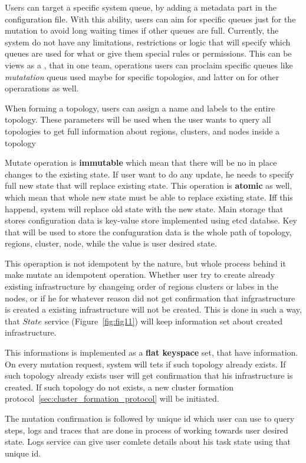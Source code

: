 Users can target a specific system queue, by adding a metadata part in the configuration file. With this ability, users can aim for specific queues just for the mutation to avoid long waiting times if other queues are full. Currently, the system do not have any limitations, restrictions or logic that will specify which queues are used for what or give them special rules or permissions. This can be views as a , that in one team, operations users can proclaim specific queues like \textit{mutatation} queus used maybe for specific topologies, and latter on for other operarations as well.

When forming a topology, users can assign a name and labels to the entire topology. These parameters will be used when the user wants to query all topologies to get full information about regions, clusters, and nodes inside a topology

Mutate operation is \textbf{immutable} which mean that there will be no in place changes to the existing state. If user want to do any update, he needs to specify full new state that will replace existing state. This operation is \textbf{atomic} as well, which mean that whole new state must be able to replace existing state. Iff this happend, system will replace old state with the new state. Main storage that stores configuration data is key-value store implemented using etcd databse. Key that will be used to store the confuguration data is the whole path of topology, regions, cluster, node, while the value is user desired state.

This operaption is not idempotent by the nature, but whole process behind it make mutate an idempotent operation. Whether user try to create already existing infrastructure by changeing order of regions clusters or labes in the nodes, or if he for whatever reason did not get confirmation that infgrastructure is created a existing infrastructure will not be created. This is done in such a way, that $State$ service (Figure~\ref{fig:fig11}) will keep information set about created infrastructure. 

This informations is implemented as a \textbf{flat keyspace} set, that have information. On every mutation request, system will tets if such topology already exists. If such topology already exists user will get confirmation that his infrastructure is created. If such topology do not exists, a new cluster formation protocol~\ref{sec:cluster_formation_protocol} will be initiated.

The mutation confirmation is followed by unique id which user can use to query steps, logs and traces that are done in process of working towards user desired state. Logs service can give user comlete details about his task state using that unique id.

